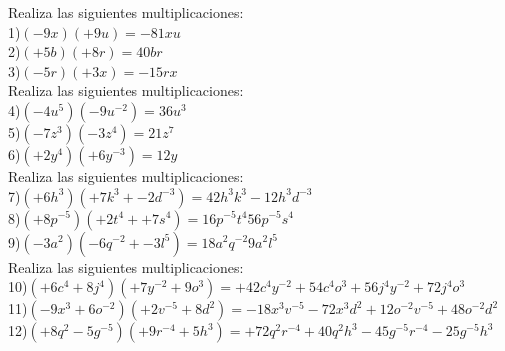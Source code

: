 \documentclass[a4paper,12pt]{article}
\begin{document}
 \pagebreak 
Realiza las siguientes multiplicaciones: \vspace{1cm}\\ 
1)$(-9x)(+9u)=-81xu $\vspace{1cm}\\ 
2)$(+5b)(+8r)=40br $\vspace{1cm}\\ 
3)$(-5r)(+3x)=-15rx $\vspace{1cm}\\ 
Realiza las siguientes multiplicaciones: \vspace{1cm}\\ 
4)$(-4u^{5})(-9u^{-2} )=36u^{3} $\vspace{1cm}\\ 
5)$(-7z^{3})(-3z^{4} )=21z^{7} $\vspace{1cm}\\ 
6)$(+2y^{4})(+6y^{-3} )=12y $\vspace{1cm}\\ 
Realiza las siguientes multiplicaciones: \vspace{1cm}\\ 
7)$(+6h^{3})(+7k^{3}+-2d^{-3} )= 42h^{3}k^{3}-12h^{3}d^{-3}   $\vspace{1cm}\\ 
8)$(+8p^{-5})(+2t^{4}++7s^{4} )= 16p^{-5}t^{4}56p^{-5}s^{4}   $\vspace{1cm}\\ 
9)$(-3a^{2})(-6q^{-2}+-3l^{5} )= 18a^{2}q^{-2}9a^{2}l^{5}   $\vspace{1cm}\\ 
Realiza las siguientes multiplicaciones: \vspace{1cm}\\ 
10)$(+6c^{4}+8j^{4} )(+7y^{-2}+9o^{3} )= +42c^{4}y^{-2}+54c^{4}o^{3}+56j^{4}y^{-2}+72j^{4}o^{3}$\vspace{1cm}\\ 
11)$(-9x^{3}+6o^{-2} )(+2v^{-5}+8d^{2} )= -18x^{3}v^{-5}-72x^{3}d^{2}+12o^{-2}v^{-5}+48o^{-2}d^{2}$\vspace{1cm}\\ 
12)$(+8q^{2}-5g^{-5} )(+9r^{-4}+5h^{3} )= +72q^{2}r^{-4}+40q^{2}h^{3}-45g^{-5}r^{-4}-25g^{-5}h^{3}$\vspace{1cm}\\ 
\end{document}
